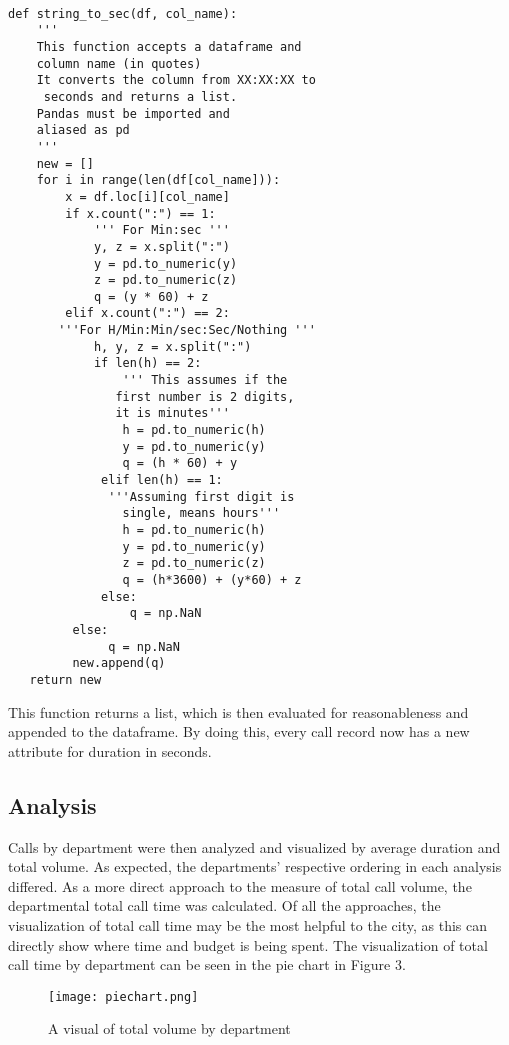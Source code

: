 \documentclass[11pt,twocolumn]{article}
\begin{document}
  \begin{Verbatim}[fontsize=\small]
  
def string_to_sec(df, col_name):
    ''' 
    This function accepts a dataframe and 
    column name (in quotes)
    It converts the column from XX:XX:XX to
     seconds and returns a list.
    Pandas must be imported and 
    aliased as pd
    '''
    new = []
    for i in range(len(df[col_name])):
        x = df.loc[i][col_name]
        if x.count(":") == 1:
            ''' For Min:sec '''
            y, z = x.split(":")
            y = pd.to_numeric(y)
            z = pd.to_numeric(z)
            q = (y * 60) + z
        elif x.count(":") == 2:
       '''For H/Min:Min/sec:Sec/Nothing '''
            h, y, z = x.split(":")
            if len(h) == 2:
                ''' This assumes if the
               first number is 2 digits,
               it is minutes'''
                h = pd.to_numeric(h)
                y = pd.to_numeric(y)
                q = (h * 60) + y
             elif len(h) == 1:
              '''Assuming first digit is 
                single, means hours'''
                h = pd.to_numeric(h)
                y = pd.to_numeric(y)
                z = pd.to_numeric(z)
                q = (h*3600) + (y*60) + z
             else:
                 q = np.NaN
         else:
              q = np.NaN
         new.append(q)
   return new
  \end{Verbatim}

This function returns a list, which is then evaluated for reasonableness and appended to the dataframe.  By doing this, every call record now has a new attribute for duration in seconds.

\subsection{Analysis}
Calls by department were then analyzed and visualized by average duration and total volume.  As expected, the departments' respective ordering in each analysis differed.  As a more direct approach to the measure of total call volume, the departmental total call time was calculated.  Of all the approaches, the visualization of total call time may be the most helpful to the city, as this can directly show where time and budget is being spent.  The visualization of total call time by department can be seen in the pie chart in Figure 3.
\begin{figure}[h]
  \texttt{[image: piechart.png]}
  \caption{A visual of total volume by department}
 \end{figure}
 
\end{document}
